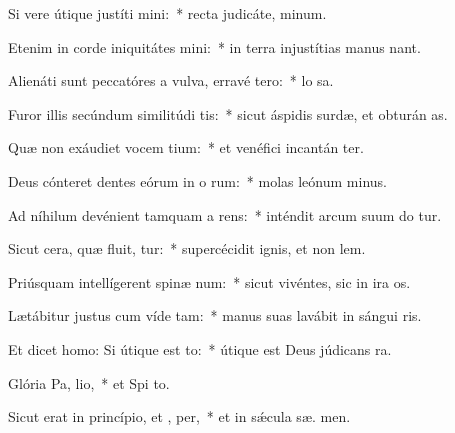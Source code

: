 \item Si vere útique justíti mini:~* recta judicáte,  minum.
\item Etenim in corde iniquitátes mini:~* in terra injustítias manus  nant.
\item Alienáti sunt peccatóres a vulva, erravé  tero:~* lo  sa.
\item Furor illis secúndum similitúdi tis:~* sicut áspidis surdæ, et obturán  as.
\item Quæ non exáudiet vocem tium:~* et venéfici incantán ter.
\item Deus cónteret dentes eórum in o rum:~* molas leónum  minus.
\item Ad níhilum devénient tamquam a rens:~* inténdit arcum suum do tur.
\item Sicut cera, quæ fluit, tur:~* supercécidit ignis, et non  lem.
\item Priúsquam intellígerent spinæ  num:~* sicut vivéntes, sic in ira  os.
\item Lætábitur justus cum víde tam:~* manus suas lavábit in sángui ris.
\item Et dicet homo: Si útique est  to:~* útique est Deus júdicans   ra.
\item Glória Pa,  lio,~* et Spi to.
\item Sicut erat in princípio, et ,  per,~* et in sǽcula sæ. men.
